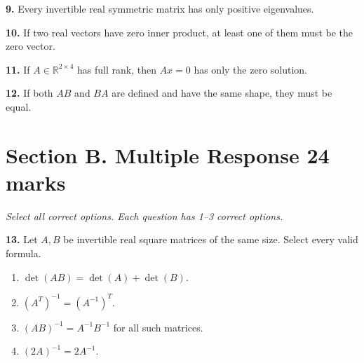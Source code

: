 \documentclass[11pt,a4paper]{article}
\begin{document}
\par\noindent\begin{minipage}{\linewidth}
\textbf{9.} Every invertible real symmetric matrix has only positive eigenvalues.
\end{minipage}\par\vspace{3mm}
\par\noindent\begin{minipage}{\linewidth}
\textbf{10.} If two real vectors have zero inner product, at least one of them must be the zero vector.
\end{minipage}\par\vspace{3mm}
\par\noindent\begin{minipage}{\linewidth}
\textbf{11.} If \(A\in\mathbb R^{2\times4}\) has full rank, then \(Ax=0\) has only the zero solution.
\end{minipage}\par\vspace{3mm}
\par\noindent\begin{minipage}{\linewidth}
\textbf{12.} If both \(AB\) and \(BA\) are defined and have the same shape, they must be equal.
\end{minipage}\par\vspace{3mm}
\newpage\section*{Section B. Multiple Response \hfill 24 marks}
\textit{Select all correct options. Each question has 1--3 correct options.}\par
\par\noindent\begin{minipage}{\linewidth}
\textbf{13.} Let \(A,B\) be invertible real square matrices of the same size. Select every valid formula.
\begin{enumerate}[label=(\Alph*),leftmargin=8mm,itemsep=2pt,topsep=2pt]
\item \(\det(AB)=\det(A)+\det(B)\).
\item \((A^T)^{-1}=(A^{-1})^T\).
\item \((AB)^{-1}=A^{-1}B^{-1}\) for all such matrices.
\item \((2A)^{-1}=2A^{-1}\).
\end{enumerate}

\end{minipage}\par\vspace{3mm}
\end{document}
